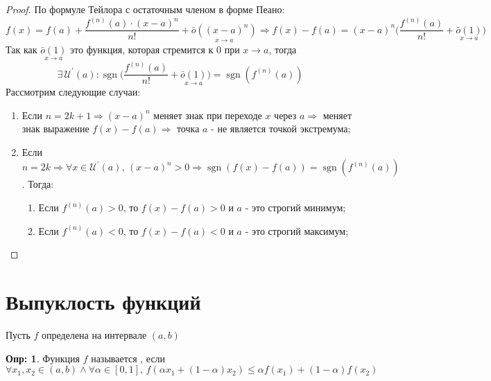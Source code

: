 \documentclass[12pt]{article}
\newcommand{\MU}{\mathcal{U}}
\theoremstyle{definition}
\newtheorem{defn}{Опр:}
\DeclareMathOperator{\sgn}{sgn}
\begin{document}
\begin{proof}
	По формуле Тейлора с остаточным членом в форме Пеано: 
	$$f(x) = f(a) + \dfrac{f^{(n)}(a){\cdot}(x-a)^n}{n!} + \underset{x \to a}{\bar{o}((x-a)^n)} \Rightarrow f(x) - f(a) = (x-a)^{n} \bigg(\dfrac{f^{(n)}(a)}{n!} + \underset{x \to a}{\bar{o}(1)} \bigg)$$
	Так как $\underset{x \to a}{\bar{o}(1)}$ это функция, которая стремится к $0$ при  $x \to a$, тогда
	$$\exists \, \MU^\prime(a) \colon \sgn{\bigg(\dfrac{f^{(n)}(a)}{n!} + \underset{x \to a}{\bar{o}(1)} \bigg)} = \sgn{(f^{(n)}(a))}$$
	Рассмотрим следующие случаи:
	\begin{enumerate}[label={(\arabic*)}]
		\item Если $n = 2k+1 \Rightarrow (x-a)^n$ меняет знак при переходе $x$ через $a \Rightarrow$ меняет знак выражение $f(x) - f(a) \Rightarrow$ точка $a$ - не является точкой экстремума;
		
		\item Если $n = 2k \Rightarrow \forall x \in \MU^\prime(a), \, (x-a)^n > 0  \Rightarrow \sgn{(f(x) -f(a))} = \sgn{(f^{(n)}(a))}$. Тогда:
		\begin{enumerate}[label=(\alph*)]
			\item Если $f^{(n)}(a) > 0$, то $f(x) - f(a) > 0$ и $a$ - это строгий минимум;
			\item Если $f^{(n)}(a) < 0$, то $f(x) - f(a) < 0$ и $a$ - это строгий максимум;
		\end{enumerate}
	\end{enumerate}
\end{proof}

\newpage
\section*{Выпуклость функций}
Пусть $f$ определена на интервале $(a,b)$

\begin{defn}
	Функция $f$ называется , если 
	$$\forall x_1, x_2 \in (a,b) \wedge \forall \alpha \in [0,1], \, f(\alpha x_1 + (1-\alpha) x_2) \leq \alpha f(x_1) + (1-\alpha)f(x_2)$$
\end{defn}
\end{document}
